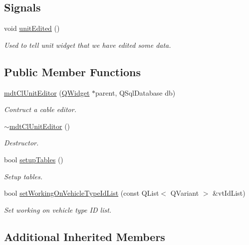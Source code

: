 \subsection*{Signals}
\begin{DoxyCompactItemize}
\item 
void \hyperlink{classmdt_cl_unit_editor_a229445497d158436289db1c87b38009b}{unit\-Edited} ()
\begin{DoxyCompactList}\small\item\em Used to tell unit widget that we have edited some data. \end{DoxyCompactList}\end{DoxyCompactItemize}
\subsection*{Public Member Functions}
\begin{DoxyCompactItemize}
\item 
\hyperlink{classmdt_cl_unit_editor_a996844e2987893ac9958c6832127538e}{mdt\-Cl\-Unit\-Editor} (\hyperlink{class_q_widget}{Q\-Widget} $\ast$parent, Q\-Sql\-Database db)
\begin{DoxyCompactList}\small\item\em Contruct a cable editor. \end{DoxyCompactList}\item 
\hyperlink{classmdt_cl_unit_editor_a63fe328168d8d72b4c09edf9123ae1a1}{$\sim$mdt\-Cl\-Unit\-Editor} ()
\begin{DoxyCompactList}\small\item\em Destructor. \end{DoxyCompactList}\item 
bool \hyperlink{classmdt_cl_unit_editor_a962cfbdda9400a7cf99ba38eec0a4155}{setup\-Tables} ()
\begin{DoxyCompactList}\small\item\em Setup tables. \end{DoxyCompactList}\item 
bool \hyperlink{classmdt_cl_unit_editor_aa685382c6fa749a8c949e13fd28e9f4f}{set\-Working\-On\-Vehicle\-Type\-Id\-List} (const Q\-List$<$ Q\-Variant $>$ \&vt\-Id\-List)
\begin{DoxyCompactList}\small\item\em Set working on vehicle type I\-D list. \end{DoxyCompactList}\end{DoxyCompactItemize}
\subsection*{Additional Inherited Members}


